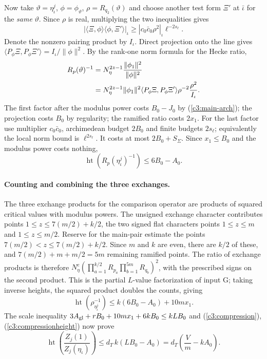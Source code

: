 Now take $\vartheta=\eta_\iota^j$, $\phi=\phi_\vartheta$,
$\rho=R_{q_2}(\vartheta)$ and choose another test form
$\Xi'$ at $\bar\iota$ for the \emph{same} $\vartheta$.
Since $\rho$ is real, multiplying the two inequalities gives
\[
 |\langle\Xi,\phi\rangle\langle\phi,\Xi'\rangle|_\iota
 \ge |c_0\bar c_0\rho^2|_\iota\ell^{-2s_\ell}.
\]
Denote the nonzero pairing product by $I_\iota$. Direct projection
onto the line gives
$\langle P_\phi\Xi,P_\phi\Xi'\rangle=I_\iota/\|\phi\|^2$.
By the rank-one norm formula for the Hecke ratio,
\begin{align}
 R_p(\vartheta)^{-1}
 &=N_\eta^{2z-1}\frac{\|\phi_1\|^2}{\|\phi\|^2}\notag\\
 &=N_\eta^{2z-1}\|\phi_1\|^2
 \langle P_\phi\Xi,P_\phi\Xi'\rangle\rho^{-2}
 \frac{\rho^2}{I_\iota}.\label{c3:four-factors}
\end{align}
The first factor after the modulus power costs $B_0-J_0$ by
(\ref{c3:main-arch}); the projection costs $B_0$ by regularity;
the ramified ratio costs $2x_1$. For the last factor use multiplier
$c_0\bar c_0$, archimedean budget $2B_0$ and finite budgets
$2s_\ell$; equivalently the local norm bound is
$\ell^{2s_\ell}$. It costs at most $2B_0+S_{\Sigma}$.
Since $x_1\le B_0$ and the modulus power costs nothing,
\begin{equation}\label{c3:main-height}
 \operatorname{ht}(R_p(\eta_\iota^j)^{-1})
 \le 6B_0-A_0 .
\end{equation}


\paragraph{Counting and combining the three exchanges.}
The three exchange products for the comparison operator are
products of squared critical values with modulus powers.
The unsigned exchange character contributes points $1\le z\le7(m/2)+k/2$,
the two signed flat characters points $1\le z\le m$ and
$1\le z\le m/2$. Reserve for the main-pair estimate the points
$7(m/2)<z\le7(m/2)+k/2$. Since $m$ and $k$ are even, there
are $k/2$ of these, and $7(m/2)+m+m/2=5m$ remaining
ramified points. The ratio of exchange products is therefore
$N_\eta^e(\prod_{a=1}^{k/2}R_{p_a}\prod_{b=1}^{5m}
R_{q_b})^2$, with the prescribed signs on the second product.
This is the partial $L$-value factorization of input G; taking
inverse heights, the squared product doubles the counts, giving
\[
 \operatorname{ht}(\rho_{\eta_\iota^j}^{-1})
 \le k(6B_0-A_0)+10mx_1.
\]
The scale inequality
$3A_{\rm gl}+rB_0+10mx_1+6kB_0\le kLB_0$
and (\ref{c3:compression}), (\ref{c3:compressionheight}) now prove
\begin{equation}\label{c3:single-height}
 \operatorname{ht}\left(\frac{Z_j(1)}{Z_j(\eta_\iota)}\right)
 \le d_T\,k(LB_0-A_0)=d_T\left(\frac{V}{m}-kA_0\right).
\end{equation}


